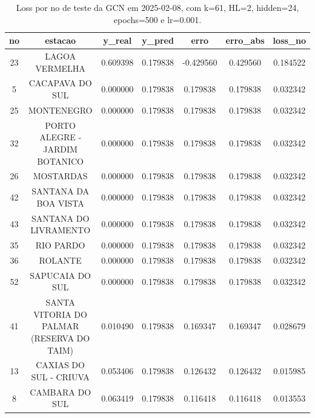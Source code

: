 \begin{table}[h]
\centering
\caption{Loss por no de teste da GCN em 2025-02-08, com k=61, HL=2, hidden=24, epochs=500 e lr=0.001.}
\label{tab:gcn_loss_k61_hl2_h24_e500_d20250208}
\begin{tabular}{ccccccc}
\toprule
no & estacao & y\_real & y\_pred & erro & erro\_abs & loss\_no \\
\midrule
23 & LAGOA VERMELHA & 0.609398 & 0.179838 & -0.429560 & 0.429560 & 0.184522 \\
5 & CACAPAVA DO SUL & 0.000000 & 0.179838 & 0.179838 & 0.179838 & 0.032342 \\
25 & MONTENEGRO & 0.000000 & 0.179838 & 0.179838 & 0.179838 & 0.032342 \\
32 & PORTO ALEGRE - JARDIM BOTANICO & 0.000000 & 0.179838 & 0.179838 & 0.179838 & 0.032342 \\
26 & MOSTARDAS & 0.000000 & 0.179838 & 0.179838 & 0.179838 & 0.032342 \\
42 & SANTANA DA BOA VISTA & 0.000000 & 0.179838 & 0.179838 & 0.179838 & 0.032342 \\
43 & SANTANA DO LIVRAMENTO & 0.000000 & 0.179838 & 0.179838 & 0.179838 & 0.032342 \\
35 & RIO PARDO & 0.000000 & 0.179838 & 0.179838 & 0.179838 & 0.032342 \\
36 & ROLANTE & 0.000000 & 0.179838 & 0.179838 & 0.179838 & 0.032342 \\
52 & SAPUCAIA DO SUL & 0.000000 & 0.179838 & 0.179838 & 0.179838 & 0.032342 \\
41 & SANTA VITORIA DO PALMAR (RESERVA DO TAIM) & 0.010490 & 0.179838 & 0.169347 & 0.169347 & 0.028679 \\
13 & CAXIAS DO SUL - CRIUVA & 0.053406 & 0.179838 & 0.126432 & 0.126432 & 0.015985 \\
8 & CAMBARA DO SUL & 0.063419 & 0.179838 & 0.116418 & 0.116418 & 0.013553 \\
\bottomrule
\end{tabular}
\end{table}
